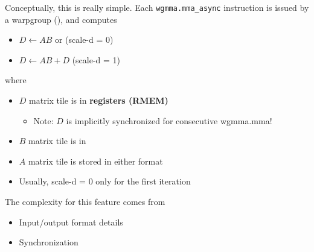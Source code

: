 \newpage
{}

\begin{minipage}[t]{0.48\textwidth}\fixminipage
Conceptually, this is really simple.
Each \texttt{wgmma.mma\_async} instruction is issued by a warpgroup (), and computes
\begin{itemize}
  \item $D \leftarrow AB$ or \hfill (scale-d = 0)
  \item $D \leftarrow AB + D$ \hfill (scale-d = 1)
\end{itemize}
where
\begin{itemize}
  \item $D$ matrix tile is in \textbf{registers (RMEM)}
  \begin{itemize}
    \item Note: $D$ is implicitly synchronized for consecutive wgmma.mma!
  \end{itemize}
  \item $B$ matrix tile is in 
  \item $A$ matrix tile is stored in either format
  \item Usually, scale-d = 0 only for the first iteration
\end{itemize}

The complexity for this feature comes from
\begin{itemize}
  \item Input/output format details 
  \item Synchronization
\end{itemize}
\end{minipage}%
\hfill
